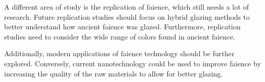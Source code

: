 A different area of study is the replication of faience, which still needs a lot of research. Future replication studies should focus on hybrid glazing methods to better understand how ancient faience was glazed. Furthermore, replication studies need to consider the wide range of colors found in ancient faience.

Additionally, modern applications of faience technology should be further explored. Conversely, current nanotechnology could be used to improve faience by increasing the quality of the raw materials to allow for better glazing.



%
%
%
